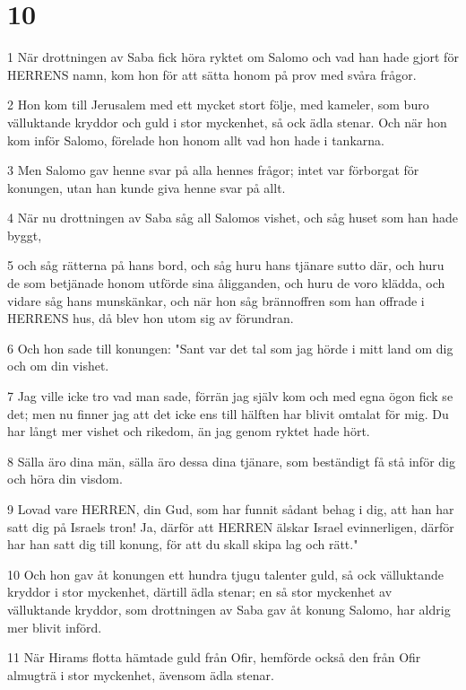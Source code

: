 \chapter{10}

\par 1 När drottningen av Saba fick höra ryktet om Salomo och vad han hade gjort för HERRENS namn, kom hon för att sätta honom på prov med svåra frågor.
\par 2 Hon kom till Jerusalem med ett mycket stort följe, med kameler, som buro välluktande kryddor och guld i stor myckenhet, så ock ädla stenar. Och när hon kom inför Salomo, förelade hon honom allt vad hon hade i tankarna.
\par 3 Men Salomo gav henne svar på alla hennes frågor; intet var förborgat för konungen, utan han kunde giva henne svar på allt.
\par 4 När nu drottningen av Saba såg all Salomos vishet, och såg huset som han hade byggt,
\par 5 och såg rätterna på hans bord, och såg huru hans tjänare sutto där, och huru de som betjänade honom utförde sina åligganden, och huru de voro klädda, och vidare såg hans munskänkar, och när hon såg brännoffren som han offrade i HERRENS hus, då blev hon utom sig av förundran.
\par 6 Och hon sade till konungen: "Sant var det tal som jag hörde i mitt land om dig och om din vishet.
\par 7 Jag ville icke tro vad man sade, förrän jag själv kom och med egna ögon fick se det; men nu finner jag att det icke ens till hälften har blivit omtalat för mig. Du har långt mer vishet och rikedom, än jag genom ryktet hade hört.
\par 8 Sälla äro dina män, sälla äro dessa dina tjänare, som beständigt få stå inför dig och höra din visdom.
\par 9 Lovad vare HERREN, din Gud, som har funnit sådant behag i dig, att han har satt dig på Israels tron! Ja, därför att HERREN älskar Israel evinnerligen, därför har han satt dig till konung, för att du skall skipa lag och rätt."
\par 10 Och hon gav åt konungen ett hundra tjugu talenter guld, så ock välluktande kryddor i stor myckenhet, därtill ädla stenar; en så stor myckenhet av välluktande kryddor, som drottningen av Saba gav åt konung Salomo, har aldrig mer blivit införd.
\par 11 När Hirams flotta hämtade guld från Ofir, hemförde också den från Ofir almugträ i stor myckenhet, ävensom ädla stenar.
